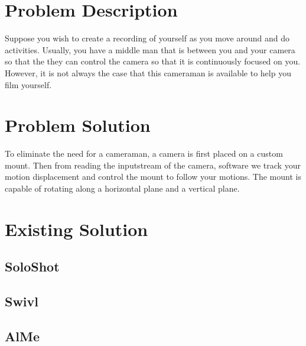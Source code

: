\documentclass[12pt]{article}
\begin{document}
\maketitle

\section{Problem Description}
Suppose you wish to create a recording of yourself as you move around and do activities. Usually, you have a middle man that is between you and your camera so that the they can control the camera so that it is continuously focused on you. However, it is not always the case that this cameraman is available to help you film yourself.

\section{Problem Solution}
To eliminate the need for a cameraman, a camera is first placed on a custom mount. Then from reading the inputstream of the camera, software we track your motion displacement and control the mount to follow your motions. The mount is capable of rotating along a horizontal plane and a vertical plane.

\section{Existing Solution}
\subsection{SoloShot}

\subsection{Swivl}

\subsection{AlMe}
\end{document}
